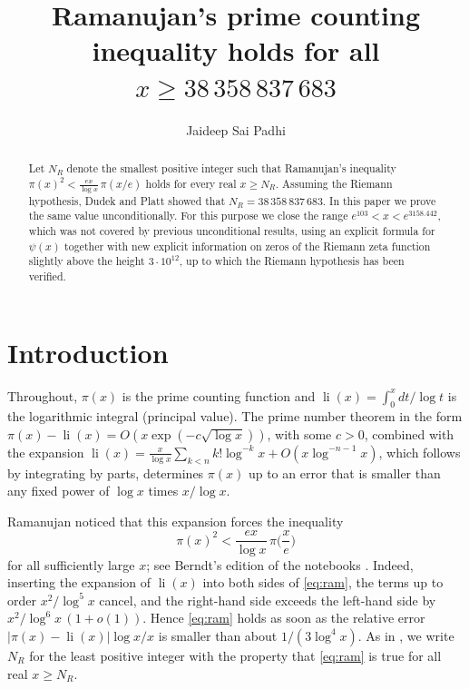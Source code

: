 \documentclass[11pt]{amsart}
\title{Ramanujan's prime counting inequality holds for all $x \geq 38\,358\,837\,683$}
\author{Jaideep Sai Padhi}
\numberwithin{equation}{section}
\theoremstyle{definition}
\theoremstyle{remark}
\newcommand{\li}{\operatorname{li}}
\begin{document}
\begin{abstract}
Let $N_R$ denote the smallest positive integer such that Ramanujan's inequality
$\pi(x)^2 < \frac{ex}{\log x}\,\pi(x/e)$ holds for every real $x \geq N_R$.
Assuming the Riemann hypothesis, Dudek and Platt showed that $N_R = 38\,358\,837\,683$.
In this paper we prove the same value unconditionally.
For this purpose we close the range $e^{103} < x < e^{3158.442}$, which was not covered by previous unconditional results, using an explicit formula for $\psi(x)$ together with new explicit information on zeros of the Riemann zeta function slightly above the height $3 \cdot 10^{12}$, up to which the Riemann hypothesis has been verified.
\end{abstract}

\maketitle

\section{Introduction}\label{sec:intro}

Throughout, $\pi(x)$ is the prime counting function and $\li(x) = \int_0^x dt/\log t$ is the logarithmic integral (principal value).
The prime number theorem in the form $\pi(x) - \li(x) = O(x\exp(-c\sqrt{\log x}))$, with some $c > 0$, combined with the expansion $\li(x) = \frac{x}{\log x}\sum_{k<n}k!\log^{-k}x + O(x\log^{-n-1}x)$, which follows by integrating by parts, determines $\pi(x)$ up to an error that is smaller than any fixed power of $\log x$ times $x/\log x$.

Ramanujan noticed that this expansion forces the inequality
\begin{equation}\label{eq:ram}
\pi(x)^2 < \frac{ex}{\log x}\,\pi\Big(\frac{x}{e}\Big)
\end{equation}
for all sufficiently large $x$; see Berndt's edition of the notebooks \cite[p.~112]{BerndtIV}.
Indeed, inserting the expansion of $\li(x)$ into both sides of \eqref{eq:ram}, the terms up to order $x^2/\log^5 x$ cancel, and the right-hand side exceeds the left-hand side by $x^2/\log^6 x\,(1+o(1))$.
Hence \eqref{eq:ram} holds as soon as the relative error $|\pi(x) - \li(x)|\log x/x$ is smaller than about $1/(3\log^4 x)$.
As in \cite{Axler}, we write $N_R$ for the least positive integer with the property that \eqref{eq:ram} is true for all real $x \geq N_R$.
\end{document}
